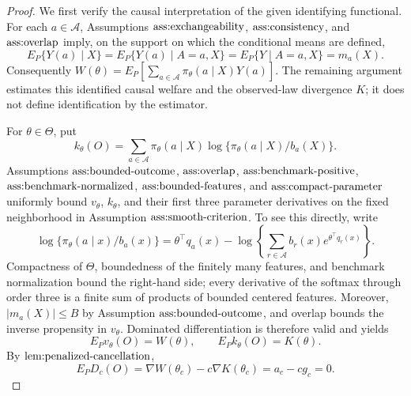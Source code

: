 \documentclass{article}
\begin{document}
\begin{proof}
We first verify the causal interpretation of the given identifying functional.  For each \(a\in\mathcal A\), Assumptions \(\textnormal{ass:exchangeability}\), \(\textnormal{ass:consistency}\), and \(\textnormal{ass:overlap}\) imply, on the support on which the conditional means are defined,
\[
 E_P\{Y(a)\mid X\}
 =E_P\{Y(a)\mid A=a,X\}
 =E_P\{Y\mid A=a,X\}=m_a(X).
\]
Consequently \(W(\theta)=E_P[\sum_{a\in\mathcal A}\pi_\theta(a\mid X)Y(a)]\).  The remaining argument estimates this identified causal welfare and the observed-law divergence \(K\); it does not define identification by the estimator.

For \(\theta\in\Theta\), put
\[
 k_\theta(O)=\sum_{a\in\mathcal A}\pi_\theta(a\mid X)
 \log\{\pi_\theta(a\mid X)/b_a(X)\}.
\]
Assumptions \(\textnormal{ass:bounded-outcome}\), \(\textnormal{ass:overlap}\), \(\textnormal{ass:benchmark-positive}\), \(\textnormal{ass:benchmark-normalized}\), \(\textnormal{ass:bounded-features}\), and \(\textnormal{ass:compact-parameter}\) uniformly bound \(v_\theta\), \(k_\theta\), and their first three parameter derivatives on the fixed neighborhood in Assumption \(\textnormal{ass:smooth-criterion}\).  To see this directly, write
\[
 \log\{\pi_\theta(a\mid x)/b_a(x)\}
 =\theta^\top q_a(x)-
 \log\!\left\{\sum_{r\in\mathcal A}b_r(x)e^{\theta^\top q_r(x)}\right\}.
\]
Compactness of \(\Theta\), boundedness of the finitely many features, and benchmark normalization bound the right-hand side; every derivative of the softmax through order three is a finite sum of products of bounded centered features.  Moreover, \(|m_a(X)|\le B\) by Assumption \(\textnormal{ass:bounded-outcome}\), and overlap bounds the inverse propensity in \(v_\theta\).  Dominated differentiation is therefore valid and yields
\[
 E_Pv_\theta(O)=W(\theta),\qquad E_Pk_\theta(O)=K(\theta).
\]
By \(\textnormal{lem:penalized-cancellation}\),
\[
 E_PD_c(O)=\nabla W(\theta_c)-c\nabla K(\theta_c)
 =a_c-cg_c=0. \tag{1}
\]


\end{proof}
\end{document}
